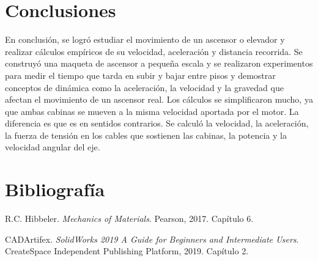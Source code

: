 \documentclass{article}
\theoremstyle{mytheoremstyle}
\theoremstyle{mytheoremstyle}
\theoremstyle{myproblemstyle}
\begin{document}
    \section*{Conclusiones}
    En conclusión, se logró estudiar el movimiento de un ascensor o elevador y realizar cálculos empíricos de su velocidad, aceleración y distancia recorrida. Se construyó una maqueta de ascensor a pequeña escala y se realizaron experimentos para medir el tiempo que tarda en subir y bajar entre pisos y demostrar conceptos de dinámica como la aceleración, la velocidad y la gravedad que afectan el movimiento de un ascensor real. Los cálculos se simplificaron mucho, ya que ambas cabinas se mueven a la misma velocidad aportada por el motor. La diferencia es que es en sentidos contrarios. Se calculó la velocidad, la aceleración, la fuerza de tensión en los cables que sostienen las cabinas, la potencia y la velocidad angular del eje.
    
    \newpage

    \section*{Bibliografía}
    R.C. Hibbeler. \emph{Mechanics of Materials}. Pearson, 2017. Capítulo 6.
    
    CADArtifex. \emph{SolidWorks 2019 A Guide for Beginners and Intermediate Users}. CreateSpace Independent Publishing Platform, 2019. Capítulo 2.
    
\end{document}
